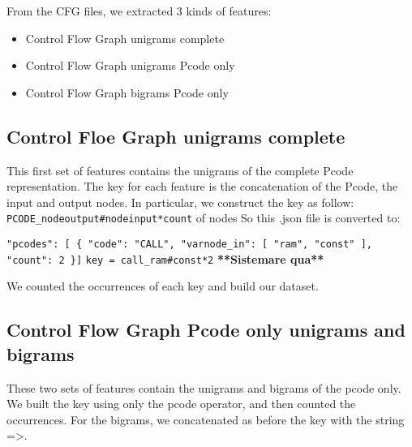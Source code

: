 From the CFG files, we extracted 3 kinds of features:
\begin{itemize}
	\item {Control Flow Graph unigrams complete}
	\item {Control Flow Graph unigrams Pcode only}
	\item {Control Flow Graph bigrams Pcode only}
\end{itemize}

\subsection{Control Floe Graph unigrams complete}
This first set of features contains the unigrams of the complete Pcode representation. The key for each feature is the concatenation of the Pcode, the input and output nodes. In particular, we construct the key as follow:
\texttt{PCODE\_nodeoutput\#nodeinput*count} of nodes
So this .json file  is converted to:

\texttt{"pcodes": [
\{
	"code": "CALL",
	"varnode\_in": [
	"ram",
	"const"
	],
	"count": 2
\}]}
\texttt{key = call\_ram\#const*2}
\textbf{**Sistemare qua**}

We counted the occurrences of each key and build our dataset.

\subsection{Control Flow Graph Pcode only unigrams and bigrams}

These two sets of features contain the unigrams and bigrams of the pcode only. We built the key using only the pcode operator, and then counted the occurrences. For the bigrams, we concatenated as before the key with the string =>.

